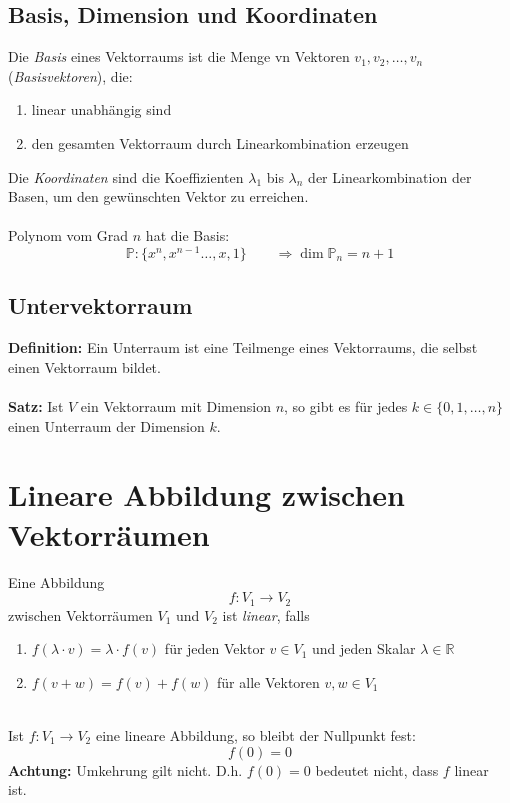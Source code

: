 \subsection{Basis, Dimension und Koordinaten}
Die \textit{Basis} eines Vektorraums ist die Menge vn Vektoren $v_1,v_2,\ldots,v_n$
(\textit{Basisvektoren}), die:
\begin{enumerate}
	\item linear unabhängig sind
	\item den gesamten Vektorraum durch Linearkombination erzeugen
\end{enumerate}

\begin{center}
\end{center}
Die \textit{Koordinaten} sind die Koeffizienten $\lambda_1$ bis $\lambda_n$ der Linearkombination
der Basen, um den gewünschten Vektor zu erreichen.
\\\\
Polynom vom Grad $n$ hat die Basis:
\[ \mathds{P}:\lbrace x^n,x^{n-1}\ldots,x,1 \rbrace \qquad\Rightarrow \dim\mathds{P}_n=n+1 \]

\subsection{Untervektorraum}
\textbf{Definition:} Ein Unterraum ist eine Teilmenge eines Vektorraums, die selbst
einen Vektorraum bildet.\\
\\
\textbf{Satz:} Ist $V$ ein Vektorraum mit Dimension $n$, so gibt es für jedes
$k\in\lbrace 0,1,\ldots,n\rbrace$ einen Unterraum der Dimension $k$.

\section{Lineare Abbildung zwischen Vektorräumen}
Eine Abbildung
\[
	f:V_1 \longrightarrow V_2
\]
zwischen Vektorräumen $V_1$ und $V_2$ ist \textit{linear}, falls
\begin{enumerate}
	\item $f(\lambda\cdot v) = \lambda\cdot f(v)$ für jeden Vektor $v\in V_1$ und jeden
		Skalar $\lambda\in\mathds{R}$
	\item $f(v+w)=f(v)+f(w)$ für alle Vektoren $v,w \in V_1$
\end{enumerate}
~\\
Ist $f: V_1 \longrightarrow V_2$ eine lineare Abbildung, so bleibt der Nullpunkt fest:
\[ f(0) = 0 \]
\textbf{Achtung:} Umkehrung gilt nicht. D.h. $f(0)=0$ bedeutet nicht, dass $f$ linear ist.

